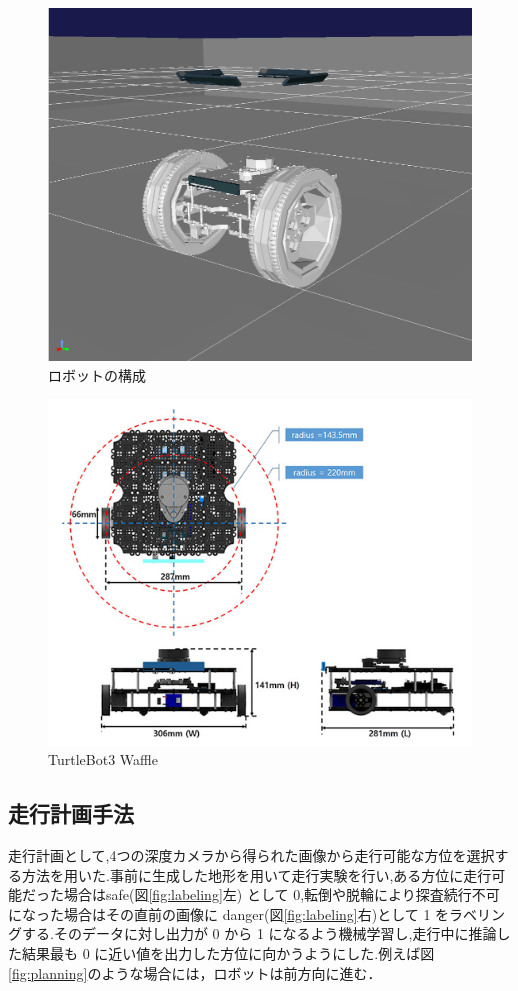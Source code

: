 \documentclass[uplatex,twocolumn, dvipdfmx]{jsarticle}  %
\begin{document}
\begin{figure}[t]
  \begin{center}
   \includegraphics[width=0.4\linewidth]{images/robot_visual.png}
   \caption{ロボットの構成}
   \label{fig:fig}
  \end{center}
 \end{figure}


\begin{figure}[t]
  \begin{center}
   \includegraphics[width=0.7\linewidth]{images/turtlebot.png}
   \caption{TurtleBot3 Waffle}
   \label{fig:turtlebot}
  \end{center}
 \end{figure}


\subsection{走行計画手法}
走行計画として,4つの深度カメラから得られた画像から走行可能な方位を選択する方法を用いた.事前に生成した地形を用いて走行実験を行い,ある方位に走行可能だった場合はsafe(図\ref{fig:labeling}左) として 0,転倒や脱輪により探査続行不可になった場合はその直前の画像に danger(図\ref{fig:labeling}右)として 1 をラベリングする.そのデータに対し出力が 0 から 1 になるよう機械学習し,走行中に推論した結果最も 0 に近い値を出力した方位に向かうようにした.例えば図\ref{fig:planning}のような場合には，ロボットは前方向に進む．
\end{document}
